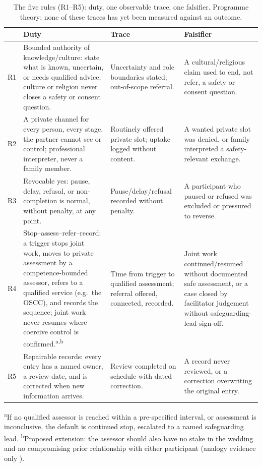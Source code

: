 \documentclass[11pt]{article}
\begin{document}
\begin{table}[t]
\centering\footnotesize
\caption{The five rules (R1--R5): duty, one observable trace, one falsifier. Programme theory; none of these traces has yet been measured against an outcome.}
\label{tab:rules}
\begin{tabularx}{\textwidth}{@{}p{0.7cm}YYY@{}}
\toprule
& \textbf{Duty} & \textbf{Trace} & \textbf{Falsifier}\\
\midrule
R1 & Bounded authority of knowledge/culture: state what is known, uncertain, or needs qualified advice; culture or religion never closes a safety or consent question. & Uncertainty and role boundaries stated; out-of-scope referral. & A cultural/religious claim used to end, not refer, a safety or consent question.\\
R2 & A private channel for every person, every stage, the partner cannot see or control; professional interpreter, never a family member. & Routinely offered private slot; uptake logged without content. & A wanted private slot was denied, or family interpreted a safety-relevant exchange.\\
R3 & Revocable yes: pause, delay, refusal, or non-completion is normal, without penalty, at any point. & Pause/delay/refusal recorded without penalty. & A participant who paused or refused was excluded or pressured to reverse.\\
R4 & Stop--assess--refer--record: a trigger stops joint work, moves to private assessment by a competence-bounded assessor, refers to a qualified service (e.g.\ the OSCC), and records the sequence; joint work never resumes where coercive control is confirmed.\textsuperscript{a,b} & Time from trigger to qualified assessment; referral offered, connected, recorded. & Joint work continued/resumed without documented safe assessment, or a case closed by facilitator judgement without safeguarding-lead sign-off.\\
R5 & Repairable records: every entry has a named owner, a review date, and is corrected when new information arrives. & Review completed on schedule with dated correction. & A record never reviewed, or a correction overwriting the original entry.\\
\bottomrule
\end{tabularx}
\smallskip

\noindent\footnotesize\textsuperscript{a}If no qualified assessor is reached within a pre-specified interval, or assessment is inconclusive, the default is continued stop, escalated to a named safeguarding lead. \textsuperscript{b}Proposed extension: the assessor should also have no stake in the wedding and no compromising prior relationship with either participant (analogy evidence only \cite{ref158,ref162}).
\end{table}
\FloatBarrier
\end{document}
